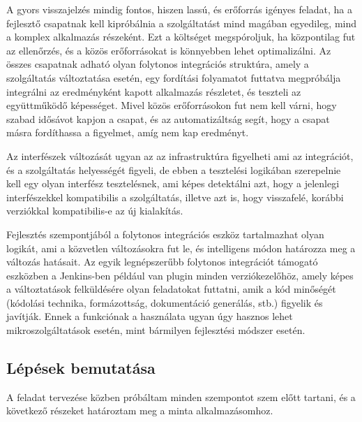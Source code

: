 \documentclass[11pt,magyar,a4paper,twoside,]{report}
\begin{document}
A gyors visszajelzés mindig fontos, hiszen lassú, és erőforrás igényes
feladat, ha a fejlesztő csapatnak kell kipróbálnia a szolgáltatást mind
magában egyedileg, mind a komplex alkalmazás részeként. Ezt a költséget
megspóroljuk, ha központilag fut az ellenőrzés, és a közös erőforrásokat
is könnyebben lehet optimalizálni. Az összes csapatnak adható olyan
folytonos integrációs struktúra, amely a szolgáltatás változtatása
esetén, egy fordítási folyamatot futtatva megpróbálja integrálni az
eredményként kapott alkalmazás részletet, és teszteli az együttműködő
képességet. Mivel közös erőforrásokon fut nem kell várni, hogy szabad
idősávot kapjon a csapat, és az automatizáltság segít, hogy a csapat
másra fordíthassa a figyelmet, amíg nem kap eredményt.

Az interfészek változását ugyan az az infrastruktúra figyelheti ami az
integrációt, és a szolgáltatás helyességét figyeli, de ebben a
tesztelési logikában szerepelnie kell egy olyan interfész tesztelésnek,
ami képes detektálni azt, hogy a jelenlegi interfészekkel kompatibilis a
szolgáltatás, illetve azt is, hogy visszafelé, korábbi verziókkal
kompatibilis-e az új kialakítás.

Fejlesztés szempontjából a folytonos integrációs eszköz tartalmazhat
olyan logikát, ami a közvetlen változásokra fut le, és intelligens módon
határozza meg a változás hatásait. Az egyik legnépszerűbb folytonos
integrációt támogató eszközben a Jenkins-ben például van plugin minden
verziókezelőhöz, amely képes a változtatások felküldésére olyan
feladatokat futtatni, amik a kód minőségét (kódolási technika,
formázottság, dokumentáció generálás, stb.) figyelik és javítják. Ennek
a funkciónak a használata ugyan úgy hasznos lehet mikroszolgáltatások
esetén, mint bármilyen fejlesztési módszer esetén.

\subsection{Lépések bemutatása}\label{luxe9puxe9sek-bemutatuxe1sa}

A feladat tervezése közben próbáltam minden szempontot szem előtt
tartani, és a következő részeket határoztam meg a minta alkalmazásomhoz.
\end{document}

